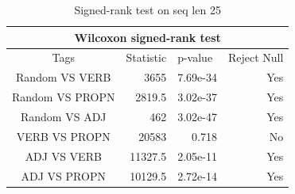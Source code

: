 \documentclass[12pt]{article}
\begin{document}
\begin{table}[!h]
\begin{center}
\fontsize{10pt}{10pt}\selectfont
\begin{tabular}{|crrr|}
\hline
\multicolumn{4}{|c|}{Wilcoxon signed-rank test}                                                                                           \\ \hline
\multicolumn{1}{|c|}{Tags}            & \multicolumn{1}{c|}{Statistic} & \multicolumn{1}{l|}{p-value}  & \multicolumn{1}{l|}{Reject Null} \\ \hline
\multicolumn{1}{|c|}{Random VS VERB}  & \multicolumn{1}{r|}{3655}      & \multicolumn{1}{r|}{7.69e-34} & Yes                              \\ \hline
\multicolumn{1}{|c|}{Random VS PROPN} & \multicolumn{1}{r|}{2819.5}    & \multicolumn{1}{r|}{3.02e-37} & Yes                              \\ \hline
\multicolumn{1}{|c|}{Random VS ADJ}   & \multicolumn{1}{r|}{462}       & \multicolumn{1}{r|}{3.02e-47} & Yes                              \\ \hline
\multicolumn{1}{|c|}{VERB VS PROPN}   & \multicolumn{1}{r|}{20583}     & \multicolumn{1}{r|}{0.718}    & No                               \\ \hline
\multicolumn{1}{|c|}{ADJ VS VERB}     & \multicolumn{1}{r|}{11327.5}   & \multicolumn{1}{r|}{2.05e-11} & Yes                              \\ \hline
\multicolumn{1}{|c|}{ADJ VS PROPN}    & \multicolumn{1}{r|}{10129.5}   & \multicolumn{1}{r|}{2.72e-14} & Yes                              \\ \hline
\end{tabular}
\caption{Signed-rank test on seq len 25}
\label{appendix:signedranktestseq25}
\end{center}    
\end{table}

\newpage
\end{document}
